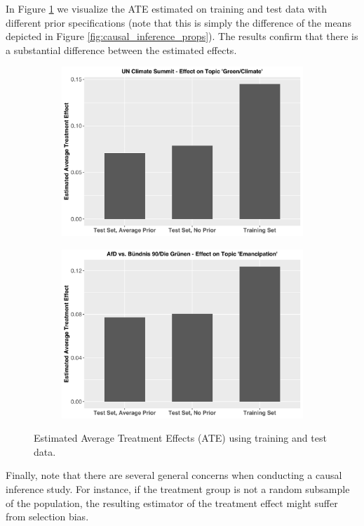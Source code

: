 In Figure \ref{fig:causal_inference_ate} we visualize the ATE estimated on training and test data with different prior specifications (note that this is simply the difference of the means depicted in Figure \ref{fig:causal_inference_props}). The results confirm that there is a substantial difference between the estimated effects.

\begin{figure}[h!]
  \centering
  \captionsetup{justification=centering,margin=2cm}
  \begin{subfigure}[b]{0.49\linewidth}
    \includegraphics[width=\linewidth]{../plots/6_2/climate_summit_ate.pdf}
  \end{subfigure}
  \begin{subfigure}[b]{0.49\linewidth}
    \includegraphics[width=\linewidth]{../plots/6_2/emancipation_ate.pdf}
  \end{subfigure}
  \caption{Estimated Average Treatment Effects (ATE) using training and test data.}
  \label{fig:causal_inference_ate}
\end{figure}

Finally, note that there are several general concerns when conducting a causal inference study. For instance, if the treatment group is not a random subsample of the population, the resulting estimator of the treatment effect might suffer from selection bias.